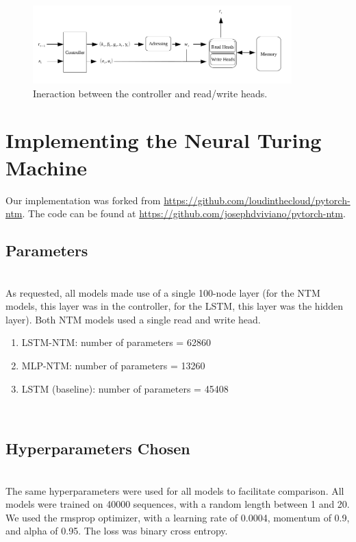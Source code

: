\documentclass{amsart}
\numberwithin{equation}{section}
\theoremstyle{definition}
\theoremstyle{remark}
\begin{document}
\begin{figure}[h]
\includegraphics[width=100mm]{ntm_graph}
\caption{Ineraction between the controller and read/write heads.}
\label{Figure 1}
\end{figure}


\section{Implementing the Neural Turing Machine}

Our implementation was forked from \url{https://github.com/loudinthecloud/pytorch-ntm}.
The code can be found at \url{https://github.com/josephdviviano/pytorch-ntm}.\\

\subsection{Parameters} \\

As requested, all models made use of a single 100-node layer (for the NTM models,
this layer was in the controller, for the LSTM, this layer was the hidden layer).
Both NTM models used a single read and write head. \\

\begin{enumerate}
  \item{LSTM-NTM: number of parameters = 62860}
  \item{MLP-NTM: number of parameters = 13260}
  \item{LSTM (baseline): number of parameters = 45408}
\end{enumerate} \\

\subsection{Hyperparameters Chosen} \\

The same hyperparameters were used for all models to facilitate comparison. All
models were trained on 40000 sequences, with a random length between 1 and 20.
We used the rmsprop optimizer, with a learning rate of 0.0004, momentum of 0.9,
and alpha of 0.95. The loss was binary cross entropy. \\
\end{document}
